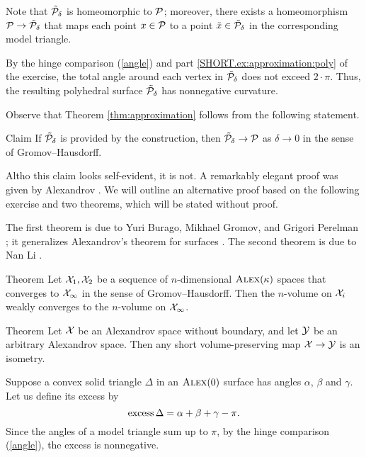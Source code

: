 Note that $\tilde{\mathcal{P}}_\delta$ is homeomorphic to $\mathcal{P}$;
moreover, there exists a homeomorphism $\mathcal{P} \to \tilde{\mathcal{P}}_\delta$ that maps each point $x \in \mathcal{P}$ to a point $\tilde{x} \in \tilde{\mathcal{P}}_\delta$ in the corresponding model triangle.

By the hinge comparison (\ref{angle}) and part \ref{SHORT.ex:approximation:poly} of the exercise, the total angle around each vertex in $\tilde{\mathcal{P}}_\delta$ does not exceed $2\cdot\pi$.
Thus, the resulting polyhedral surface $\tilde{\mathcal{P}}_\delta$ has nonnegative curvature.
\qeds

Observe that Theorem \ref{thm:approximation} follows from the following statement.

\begin{thm}{Claim}\label{clm:approximation}
If $\tilde{\mathcal{P}}_\delta$ is provided by the construction, then $\tilde{\mathcal{P}}_\delta\to\mathcal{P}$ as $\delta\to 0$ in the sense of Gromov--Hausdorff.
\end{thm}

Altho this claim looks self-evident, it is not.
A remarkably elegant proof was given by Alexandrov \cite[VII §~6]{alexandrov-1948}.
We will outline an alternative proof based on the following exercise and two theorems, which will be stated without proof.

The first theorem is due to Yuri Burago, Mikhael Gromov, and Grigori Perelman \cite[10.8]{burago-gromov-perelman};
it generalizes Alexandrov's theorem for surfaces \cite[X §~2]{alexandrov-1948}.
The second theorem is due to Nan Li \cite{li}.

\begin{thm}{Theorem}\label{thm:cont-vol}
Let $\mathcal{X}_1, \mathcal{X}_2$ be a sequence of $n$-dimensional $\textsc{Alex}(\kappa)$ spaces that converges to $\mathcal{X}_\infty$ in the sense of Gromov--Hausdorff.
Then the $n$-volume on $\mathcal{X}_i$ weakly converges to the $n$-volume on $\mathcal{X}_\infty$.
\end{thm}

\begin{thm}{Theorem}\label{thm:vol-short}
Let $\mathcal{X}$ be an Alexandrov space without boundary, and let $\mathcal{Y}$ be an arbitrary Alexandrov space.
Then any short volume-preserving map $\mathcal{X}\to\mathcal{Y}$ is an isometry.
\end{thm}

Suppose a convex solid triangle $\Delta$ in an $\textsc{Alex}(0)$ surface has angles $\alpha$, $\beta$ and $\gamma$.
Let us define its excess by
\[\operatorname{\rm excess}\nolimits\Delta=\alpha+\beta+\gamma-\pi.\]
Since the angles of a model triangle sum up to $\pi$, by the hinge comparison (\ref{angle}),
the excess is nonnegative.

